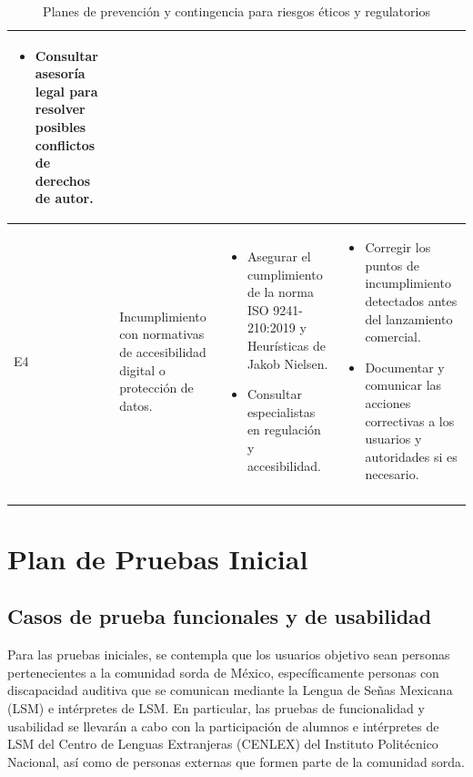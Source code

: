 \begin{longtable}{|>{\centering\arraybackslash}p{0.8cm}|>{\raggedright\arraybackslash}p{3.5cm}|>{\raggedright\arraybackslash}p{5.1cm}|>{\raggedright\arraybackslash}p{5.1cm}|}
\begin{itemize}
		\item Consultar asesoría legal para resolver posibles conflictos de derechos de autor.
	\end{itemize} \\
	\hline
	E4 & Incumplimiento con normativas de accesibilidad digital o protección de datos. &
	\begin{itemize}
		\item Asegurar el cumplimiento de la norma ISO 9241-210:2019 y Heurísticas de Jakob Nielsen.
		\item Consultar especialistas en regulación y accesibilidad.
	\end{itemize} &
	\begin{itemize}
		\item Corregir los puntos de incumplimiento detectados antes del lanzamiento comercial.
		\item Documentar y comunicar las acciones correctivas a los usuarios y autoridades si es necesario.
	\end{itemize} \\
	\hline
\caption{Planes de prevención y contingencia para riesgos éticos y regulatorios} \label{tab:riesgos_eticos} \\
\end{longtable}

\section{Plan de Pruebas Inicial}
\subsection{Casos de prueba funcionales y de usabilidad}
Para las pruebas iniciales, se contempla que los usuarios objetivo sean personas pertenecientes a la comunidad sorda de México, específicamente personas con discapacidad auditiva que se comunican mediante la Lengua de Señas Mexicana (LSM) e intérpretes de LSM. En particular, las pruebas de funcionalidad y usabilidad se llevarán a cabo con la participación de alumnos e intérpretes de LSM del Centro de Lenguas Extranjeras (CENLEX) del Instituto Politécnico Nacional, así como de personas externas que formen parte de la comunidad sorda.

